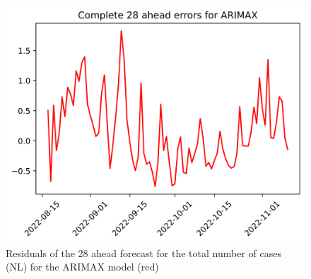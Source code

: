\begin{figure}
\begin{minipage}{.32\textwidth}
  \label{fig:tot_cases_error_28_ARIMA_DE}
\end{minipage}
\begin{minipage}{.32\textwidth}
  \centering
  \includegraphics[width=\linewidth]{pics/28_ah/28_ahead_errors_ARIMAX.png}
  \caption{Residuals of the 28 ahead forecast for the total number of cases (NL) for the ARIMAX model (red)}
  \label{fig:tot_cases_error_28_ARIMAX}
\end{minipage}

\end{figure}

